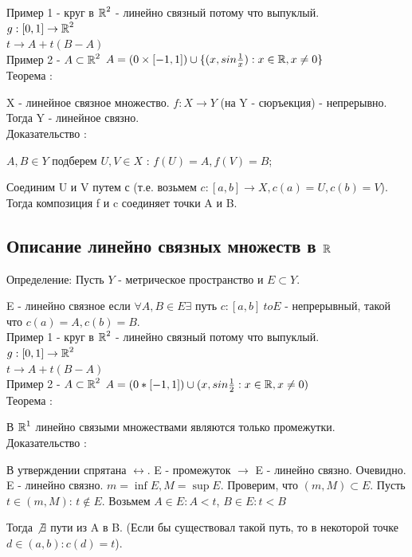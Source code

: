 Пример 1 - круг в $\operatorname*{\mathbb{R}}^2$ - линейно связный потому что выпуклый.\\
$g :[0,1] \to \operatorname*{\mathbb{R}}^2$\\
$t \to A + t(B - A)$\\

Пример 2 - $A \subset \operatorname*{\mathbb{R}}^2$   
$A = ({0} \times [-1, 1]) \cup \{(x, sin{\frac{1}{x}}) : x \in \operatorname*{\mathbb{R}}, x \not = 0\}$\\

Теорема :

X - линейное связное множество. $f : X \to Y$ (на Y - сюръекция) - непрерывно.
Тогда Y - линейное связно.\\

Доказательство :

$A, B \in Y$ подберем $U,V \in X$ : $f(U) = A, f(V) = B$;

Соединим U и V путем  с (т.е. возьмем $c : [a, b] \to X, c(a) = U, c(b) = V$). Тогда
композиция f и c соединяет точки A и B.

\newpage
\subsection{Описание линейно связных множеств в $\operatorname*{\mathbb{R}}$}
Определение: Пусть $Y$ - метрическое пространство и $E \subset Y$.

E - линейно связное если $\forall A,B \in E \exists$ путь $c:[a,b] \ to E$ - непрерывный, такой что $c(a) = A, c(b) = B$.\\

Пример 1 - круг в $\operatorname*{\mathbb{R}}^2$ - линейно связный потому что выпуклый.\\
$g :[0,1] \to \operatorname*{\mathbb{R}}^2$\\
$t \to A + t(B - A)$\\

Пример 2 - $A \subset \operatorname*{\mathbb{R}}^2$   $A = ({0} * [-1, 1]) \cup {(x, sin{\frac{1}{2}} : x \in \operatorname*{\mathbb{R}}, x \not = 0)}$\\

Теорема : 

В $\operatorname*{\mathbb{R}}^1$ линейно связыми множествами являются только промежутки.\\

Доказательство : 

В утверждении спрятана $\leftrightarrow$.
E - промежуток $\rightarrow$ E - линейно связно. Очевидно.
E - линейно связно. $m = \inf E, M = \sup E$. Проверим, что $(m, M)\subset E$.
Пусть $t \in (m, M)$: $t \not \in E$.
Возьмем $A \in E : A < t$, $B \in E : t < B$

Тогда $\not\exists$ пути из A в B. (Если бы существовал такой путь, 
то в некоторой точке $d \in (a,b) : c(d) = t$).
